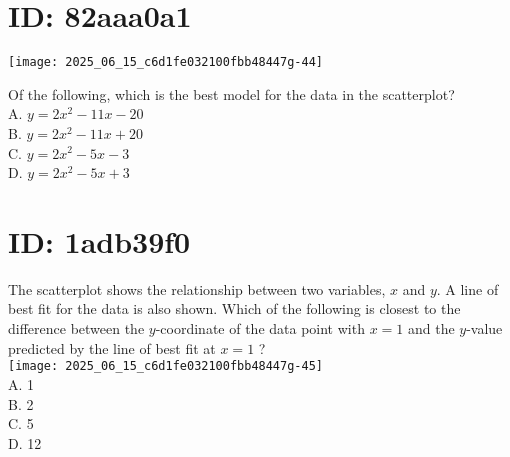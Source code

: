\section*{ID: 82aaa0a1}
\begin{center}
\texttt{[image: 2025\_06\_15\_c6d1fe032100fbb48447g-44]}
\end{center}

Of the following, which is the best model for the data in the scatterplot?\\
A. $y=2 x^{2}-11 x-20$\\
B. $y=2 x^{2}-11 x+20$\\
C. $y=2 x^{2}-5 x-3$\\
D. $y=2 x^{2}-5 x+3$

\section*{ID: 1adb39f0}
The scatterplot shows the relationship between two variables, $x$ and $y$. A line of best fit for the data is also shown. Which of the following is closest to the difference between the $y$-coordinate of the data point with $x=1$ and the $y$-value predicted by the line of best fit at $x=1$ ?\\
\texttt{[image: 2025\_06\_15\_c6d1fe032100fbb48447g-45]}\\
A. 1\\
B. 2\\
C. 5\\
D. 12


